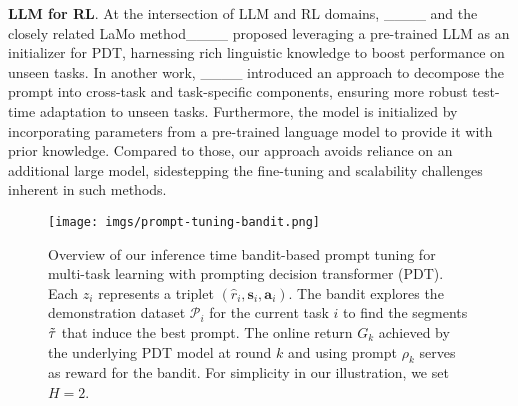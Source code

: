\textbf{LLM for RL}. At the intersection of LLM and RL domains, ____ and the closely related LaMo method____ proposed leveraging a pre-trained LLM as an initializer for PDT, harnessing rich linguistic knowledge to boost performance on unseen tasks. In another work, ____ introduced an approach to decompose the prompt into cross-task and task-specific components, ensuring more robust test-time adaptation to unseen tasks. Furthermore, the model is initialized by incorporating parameters from a pre-trained language model to provide it with prior knowledge. Compared to those, our approach avoids reliance on an additional large model, sidestepping the fine-tuning and scalability challenges inherent in such methods.

\begin{figure*}[tbp]
    \centering
    \texttt{[image: imgs/prompt-tuning-bandit.png]}
    \caption{Overview of our inference time bandit-based prompt tuning for multi-task learning with prompting decision transformer (PDT). Each $z_i$ represents a triplet $(\hat{r}_i, \mathbf{s}_i, \mathbf{a}_i)$. The bandit explores the demonstration dataset $\mathcal{P}_i$ for the current task $i$ to find the segments $\Tilde{\tau}$ that induce the best prompt. The online return $G_k$ achieved by the underlying PDT model at round $k$ and using prompt $\rho_k$ serves as reward for the bandit. For simplicity in our illustration, we set $H=2$.}
    \label{fig:prompt_dt_bandit}
\end{figure*}